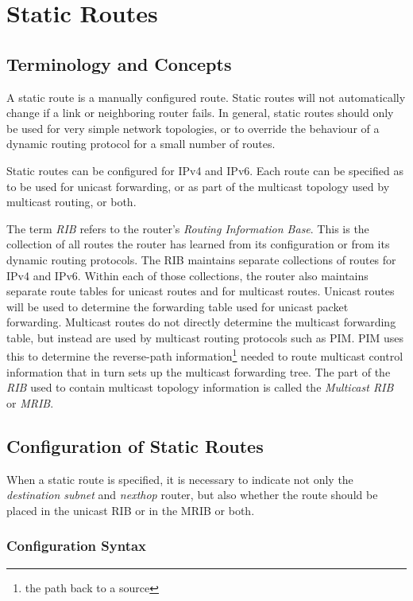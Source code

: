 \chapter{Static Routes}
\label{staticroutes}
\section{Terminology and Concepts}

A static route is a manually configured route.  Static routes will not
automatically change if a link or neighboring router fails.  In
general, static routes should only be used for very simple network
topologies, or to override the behaviour of a dynamic routing protocol
for a small number of routes.

Static routes can be configured for IPv4 and IPv6.  Each route can be
specified as to be used for unicast forwarding, or as part of the
multicast topology used by multicast routing, or both.  

The term {\it RIB} refers to the router's {\it Routing Information
Base}.  This is the collection of all routes the router has learned
from its configuration or from its dynamic routing protocols.  The RIB
maintains separate collections of routes for IPv4 and IPv6.  Within
each of those collections, the router also maintains separate route
tables for unicast routes and for multicast routes.  Unicast routes
will be used to determine the forwarding table used for unicast packet
forwarding.  Multicast routes do not directly determine the multicast
forwarding table, but instead are used by multicast routing protocols
such as PIM.  PIM uses this to determine the reverse-path
information\footnote{the path back to a source} needed to route
multicast control information that in turn sets up the multicast
forwarding tree.  The part of the {\it RIB} used to contain multicast
topology information is called the {\it Multicast RIB} or {\it MRIB}.

\newpage
\section{Configuration of Static Routes}

When a static route is specified, it is necessary to indicate not only
the {\it destination subnet} and {\it nexthop} router, but also
whether the route should be placed in the unicast RIB or in the MRIB
or both.

\subsection{Configuration Syntax}

